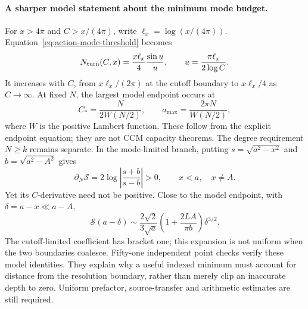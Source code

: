 \paragraph{A sharper model statement about the minimum mode budget.}
For $x>4\pi$ and $C>x/(4\pi)$, write $\ell_x=\log(x/(4\pi))$.
Equation~\eqref{eq:action-mode-threshold} becomes
\[
 N_{\rm turn}(C,x)=\frac{x\ell_x}{4}\frac{\sin u}{u},
 \qquad u=\frac{\pi\ell_x}{2\log C}.
\]
It increases with $C$, from $x\ell_x/(2\pi)$ at the cutoff boundary
to $x\ell_x/4$ as $C\to\infty$. At fixed $N$, the largest model
endpoint occurs at
\[
 C_* =\frac{N}{2W(N/2)},\qquad
 a_{\max}=\frac{2\pi N}{W(N/2)},
\]
where $W$ is the positive Lambert function. These follow from the
explicit endpoint equation; they are not CCM capacity theorems.
The degree requirement $N\geq k$ remains separate. In the mode-limited
branch, putting $s=\sqrt{a^2-x^2}$ and $b=\sqrt{a^2-A^2}$ gives
\[
 \partial_N\mathcal S=2\log\left|\frac{s+b}{s-b}\right|>0,
 \qquad x<a,\quad x\ne A.
\]
Yet its $C$-derivative need not be positive. Close to the model endpoint,
with $\delta=a-x\ll a-A$,
\[
 \mathcal S(a-\delta)\sim
 \frac{2\sqrt2}{3\sqrt a}
 \left(1+\frac{2LA}{\pi b}\right)\delta^{3/2}.
\]
The cutoff-limited coefficient has bracket one; this expansion is not
uniform when the two boundaries coalesce. Fifty-one independent point
checks verify these model identities. They explain why a useful indexed
minimum must account for distance from the resolution boundary, rather
than merely clip an inaccurate depth to zero. Uniform prefactor,
source-transfer and arithmetic estimates are still required.
